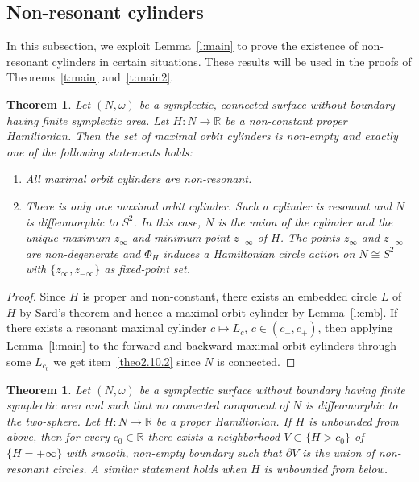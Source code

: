 \documentclass[10pt]{amsart}
\newtheorem{theo}[cdrthm]{Theorem}
\theoremstyle{definition}
\newcommand{\R}{\mathbb{R}}
\newcommand{\p}{\partial}
\begin{document}
\subsection{Non-resonant cylinders}
In this subsection, we exploit Lemma~\ref{l:main} to prove the existence of non-resonant cylinders in certain situations. These results will be used in the proofs of Theorems~\ref{t:main} and~\ref{t:main2}.

\begin{theo}\label{t:dichotomy}
Let $(N,\omega)$ be a symplectic, connected surface without boundary having finite symplectic area. Let $H:N\to\R$ be a non-constant proper Hamiltonian. Then the set of maximal orbit cylinders is non-empty and exactly one of the following statements holds:
\begin{enumerate}
\item\label{theo2.10.1} All maximal orbit cylinders are non-resonant.
\item\label{theo2.10.2} There is only one maximal orbit cylinder. Such a cylinder is resonant and $N$ is diffeomorphic to $S^2$. In this case, $N$ is the union of the cylinder and the unique maximum $z_\infty$ and minimum point $z_{-\infty}$ of $H$. The points $z_\infty$ and $z_{-\infty}$ are non-degenerate and $\Phi_H$ induces a Hamiltonian circle action on $N\cong S^2$ with $\{z_\infty,z_{-\infty}\}$ as fixed-point set.
\end{enumerate}
\end{theo}


\begin{proof}
Since $H$ is proper and non-constant, there exists an embedded circle $L$ of $H$ by Sard's theorem and hence a maximal orbit cylinder by Lemma~\ref{l:emb}. If there exists a resonant maximal cylinder $c\mapsto L_{c}$, $c\in(c_-,c_+)$, then applying Lemma~\ref{l:main} to the forward and backward maximal orbit cylinders through some $L_{c_0}$ we get item~\eqref{theo2.10.2} since $N$ is connected.
\end{proof}

\begin{theo}\label{t:unbounded}
Let $(N,\omega)$ be a symplectic surface without boundary having finite symplectic area and such that no connected component of $N$ is diffeomorphic to the two-sphere. Let $H:N\to\R$ be a proper Hamiltonian. If $H$ is unbounded from above, then for every $c_0\in\R$ there exists a neighborhood $V\subset \{H> c_0\}$ of $\{H=+\infty\}$ with smooth, non-empty boundary such that $\p V$ is the union of non-resonant circles. A similar statement holds when $H$ is unbounded from below.
\end{theo}
\end{document}
